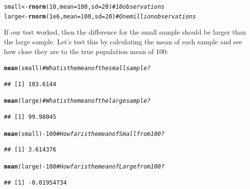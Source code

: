 \documentclass{tufte-book}\usepackage[]{graphicx}\usepackage[]{color}
\makeatletter
\newcommand{\hlnum}[1]{\textcolor[rgb]{0.686,0.059,0.569}{#1}}%
\newcommand{\hlcom}[1]{\textcolor[rgb]{0.678,0.584,0.686}{\textit{#1}}}%
\newcommand{\hlopt}[1]{\textcolor[rgb]{0,0,0}{#1}}%
\newcommand{\hlstd}[1]{\textcolor[rgb]{0.345,0.345,0.345}{#1}}%
\newcommand{\hlkwb}[1]{\textcolor[rgb]{0.69,0.353,0.396}{#1}}%
\newcommand{\hlkwc}[1]{\textcolor[rgb]{0.333,0.667,0.333}{#1}}%
\newcommand{\hlkwd}[1]{\textcolor[rgb]{0.737,0.353,0.396}{\textbf{#1}}}%
\newenvironment{kframe}{%
 \def\at@end@of@kframe{}%
 \ifinner\ifhmode%
  \def\at@end@of@kframe{\end{minipage}}%
  \begin{minipage}{\columnwidth}%
 \fi\fi%
 \def\FrameCommand##1{\hskip\@totalleftmargin \hskip-\fboxsep
 \colorbox{shadecolor}{##1}\hskip-\fboxsep
     \hskip-\linewidth \hskip-\@totalleftmargin \hskip\columnwidth}%
 \MakeFramed {\advance\hsize-\width
   \@totalleftmargin\z@ \linewidth\hsize
   \@setminipage}}%
 {\par\unskip\endMakeFramed%
 \at@end@of@kframe}
\newenvironment{knitrout}{}{} %
\makeatother
\begin{document}

\begin{footnotesize}
\begin{knitrout}
\color{fgcolor}\begin{kframe}
\begin{alltt}
\hlstd{small} \hlkwb{<-} \hlkwd{rnorm}\hlstd{(}\hlnum{10}\hlstd{,} \hlkwc{mean} \hlstd{=} \hlnum{100}\hlstd{,} \hlkwc{sd} \hlstd{=} \hlnum{20}\hlstd{)} \hlcom{# 10 observations}
\hlstd{large} \hlkwb{<-} \hlkwd{rnorm}\hlstd{(}\hlnum{1e6}\hlstd{,} \hlkwc{mean} \hlstd{=} \hlnum{100}\hlstd{,} \hlkwc{sd} \hlstd{=} \hlnum{20}\hlstd{)} \hlcom{# One million observations}
\end{alltt}
\end{kframe}
\end{knitrout}
\end{footnotesize}

If our test worked, then the difference for the small sample should be larger than the large sample. Let's test this by calculating the mean of each sample and see how close they are to the true population mean of 100:

\begin{footnotesize}
\begin{knitrout}
\color{fgcolor}\begin{kframe}
\begin{alltt}
\hlkwd{mean}\hlstd{(small)} \hlcom{# What is the mean of the small sample?}
\end{alltt}
\begin{verbatim}
## [1] 103.6144
\end{verbatim}
\begin{alltt}
\hlkwd{mean}\hlstd{(large)} \hlcom{# What is the mean of the large sample?}
\end{alltt}
\begin{verbatim}
## [1] 99.98045
\end{verbatim}
\begin{alltt}
\hlkwd{mean}\hlstd{(small)} \hlopt{-} \hlnum{100} \hlcom{# How far is the mean of Small from 100?}
\end{alltt}
\begin{verbatim}
## [1] 3.614376
\end{verbatim}
\begin{alltt}
\hlkwd{mean}\hlstd{(large)} \hlopt{-} \hlnum{100} \hlcom{# How far is the mean of Large from 100?}
\end{alltt}
\begin{verbatim}
## [1] -0.01954734
\end{verbatim}
\end{kframe}
\end{knitrout}
\end{footnotesize}
\end{document}

